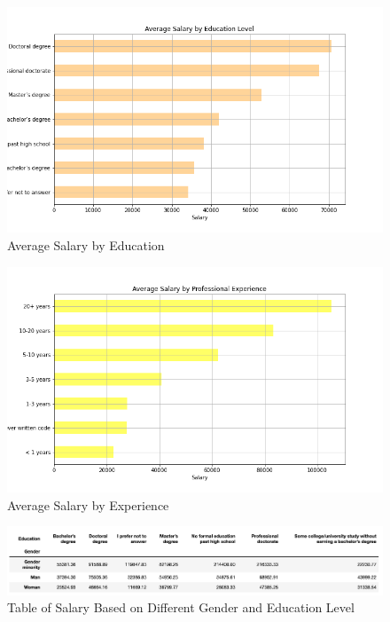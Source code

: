 \documentclass[10pt,onecolumn,letterpaper]{article}
\begin{document}
\begin{figure}[htbp]
  \centering
  \includegraphics[width=1\textwidth]{f3.png}
  \caption{Average Salary by Education}
\end{figure}

\begin{figure}[htbp]
  \centering
  \includegraphics[width=1\textwidth]{f4.png}
  \caption{Average Salary by Experience}
\end{figure}

\begin{figure}[htbp]
  \centering
  \includegraphics[width=1\textwidth]{f5.png}
  \caption{Table of Salary Based on Different Gender and Education Level}
\end{figure}
\end{document}
